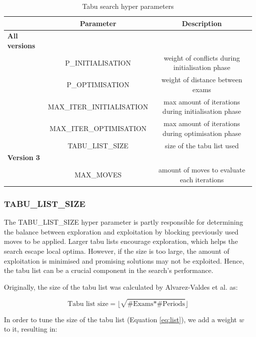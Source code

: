 \begin{table}[h]
	\caption{Tabu search hyper parameters}
	\label{tab:possible_parameters}
	\centering
	\begin{tabular}{l c c}
		\hline
		& \textbf{Parameter} & \textbf{Description}  \\ \hline
        \textbf{All versions} & &\\ 
		& P\_INITIALISATION & weight of conflicts during initialisation phase \\
        & P\_OPTIMISATION  & weight of distance between exams\\
	    & MAX\_ITER\_INITIALISATION & max amount of iterations during initialisation phase \\
        & MAX\_ITER\_OPTIMISATION & max amount of iterations during optimisation phase\\ 
        & TABU\_LIST\_SIZE & size of the tabu list used\\
        \textbf{Version 3} & &\\ 
        & MAX\_MOVES & amount of moves to evaluate each iterations \\ 
        \hline
	\end{tabular}
\end{table}





\subsubsection{TABU\_LIST\_SIZE }

The TABU\_LIST\_SIZE hyper parameter is partly responsible for determining the balance between exploration and exploitation by blocking previously used moves to be applied. Larger tabu lists encourage exploration, which helps the search escape local optima. However, if the size is too large, the amount of exploitation is minimised and promising solutions may not be exploited. Hence, the tabu list can be a crucial component in the search's performance.

Originally, the size of the tabu list was calculated by Alvarez-Valdes et al. as:

\begin{equation}
    \text{Tabu list size} = \lfloor \sqrt{\text{\# Exams} * \text{\# Periods}}\rfloor
\end{equation}

In order to tune the size of the tabu list (Equation \ref{eq:list}), we add a weight $w$ to it, resulting in:

